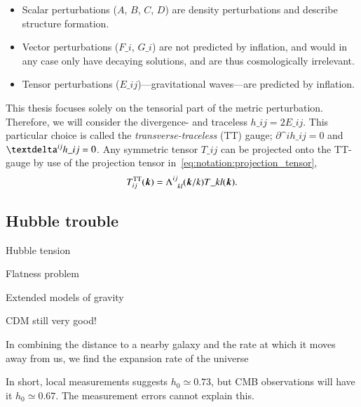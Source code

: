     \begin{itemize}
        \item Scalar perturbations ($A$, $B$, $C$, $D$) are density perturbations and describe structure formation.
        \item Vector perturbations ($F\_i$, $G\_i$) are not predicted by inflation, and would in any case only have decaying solutions, and are thus cosmologically irrelevant.
        \item Tensor perturbations ($E\_{ij}$)---gravitational waves---are predicted by inflation.
    \end{itemize}


    This thesis focuses solely on the tensorial part of the metric perturbation. Therefore, we will consider the divergence- and traceless $h\_{ij}=2E\_{ij}$. This particular choice is called the \emph{transverse-traceless} (TT) gauge; $\partial\^i h\_{ij} =0$ and $\Krondelta{^{ij}}h\_{ij}=0$. Any symmetric tensor $T\_{ij}$ can be projected onto the TT-gauge by use of the projection tensor in~\cref{eq:notation:projection_tensor},
    \begin{equation}
        T\ap{TT}_{ij}(\vec{k}) = \Lambda\indices{^{ij}_{kl}}(\vec{k}/k) T\_{kl}(\vec{k}).
    \end{equation}



\subsection{Hubble trouble}\label{sec:GR:lcdm:problems}
    \begin{bullets}
        \item Hubble tension
        \item Flatness problem
        \item Extended models of gravity
        \item \textLambda{}CDM still very good!
    \end{bullets}


    
    
    
    In combining the distance to a nearby galaxy and the rate at which it moves away from us, we find the expansion rate of the universe


    In short, local measurements suggests $h_0 \simeq 0.73$, but CMB observations will have it $h_0\simeq 0.67$. The measurement errors cannot explain this. 